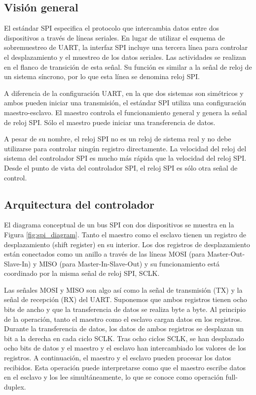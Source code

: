     \subsection{Visión general}

    El estándar SPI especifica el protocolo que intercambia datos entre dos dispositivos a través de líneas seriales. En lugar de utilizar el esquema de sobremuestreo de UART, la interfaz SPI incluye una tercera línea para controlar el desplazamiento y el muestreo de los datos seriales. Las actividades se realizan en el flanco de transición de esta señal. Su función es similar a la señal de reloj de un sistema síncrono, por lo que esta línea se denomina reloj SPI.

    A diferencia de la configuración UART, en la que dos sistemas son simétricos y ambos pueden iniciar una transmisión, el estándar SPI utiliza una configuración maestro-esclavo. El maestro controla el funcionamiento general y genera la señal de reloj SPI. Sólo el maestro puede iniciar una transferencia de datos.

    A pesar de su nombre, el reloj SPI no es un reloj de sistema real y no debe utilizarse para controlar ningún registro directamente. La velocidad del reloj del sistema del controlador SPI es mucho más rápida que la velocidad del reloj SPI. Desde el punto de vista del controlador SPI, el reloj SPI es sólo otra señal de control.

    \subsection{Arquitectura del controlador}

    El diagrama conceptual de un bus SPI con dos dispositivos se muestra en la Figura \ref{fig:spi_diagram}. Tanto el maestro como el esclavo tienen un registro de desplazamiento (shift register) en su interior. Los dos registros de desplazamiento están conectados como un anillo a través de las líneas MOSI (para Master-Out-Slave-In) y MISO (para Master-In-Slave-Out) y su funcionamiento está coordinado por la misma señal de reloj SPI, SCLK. 

    Las señales MOSI y MISO son algo así como la señal de transmisión (TX) y la señal de recepción (RX) del UART. Suponemos que ambos registros tienen ocho bits de ancho y que la transferencia de datos se realiza byte a byte. Al principio de la operación, tanto el maestro como el esclavo cargan datos en los registros. Durante la transferencia de datos, los datos de ambos registros se desplazan un bit a la derecha en cada ciclo SCLK. Tras ocho ciclos SCLK, se han desplazado ocho bits de datos y el maestro y el esclavo han intercambiado los valores de los registros. A continuación, el maestro y el esclavo pueden procesar los datos recibidos. Esta operación puede interpretarse como que el maestro escribe datos en el esclavo y los lee simultáneamente, lo que se conoce como operación full-duplex.

